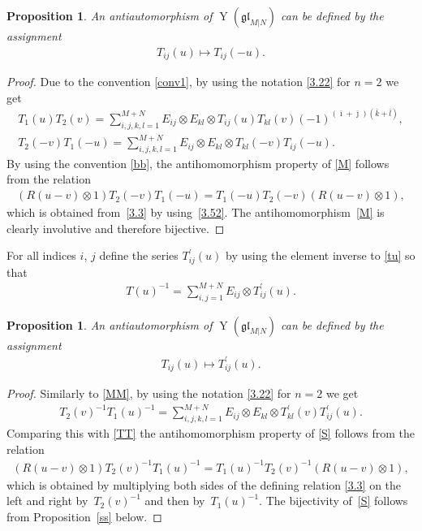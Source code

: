 \documentclass[11pt]{article}
\numberwithin{equation}{section}
\newtheorem{Proposition}[Theorem]{Proposition}
\def\bi{{\bar\imath }}
\def\bj{{\bar\jmath }}
\def\bk{{\bar k }}
\def\bl{{\bar l }}
\def\glMN{\mathfrak{gl}_{M|N}}
\def\ot{\otimes}
\def\TP{T^{\prime}}
\def\YMN{\operatorname{Y}(\glMN)}
\begin{document}
\begin{Proposition}\label{m}
An antiautomorphism of $\YMN$ can be defined by the assignment
\begin{gather}\label{M}
T_{ij}(u)\mapsto T_{ij}(-u) .
\end{gather}
\end{Proposition}

\begin{proof}Due to the convention \eqref{conv1}, by using
the notation \eqref{3.22} for $n=2$ we get
\begin{gather}\label{TT}
T_1(u) T_2(v)=\sum_{i,j,k,l=1}^{M+N}
E_{ij}\ot E_{kl}\ot T_{ij}(u) T_{kl}(v)
{(-1)}^{( \bi+ \bj )( \bk+ \bl )} ,\\
\label{MM}
T_2(-v) T_1(-u)=\sum_{i,j,k,l=1}^{M+N}
E_{ij}\ot E_{kl}\ot T_{kl}(-v) T_{ij}(-u) .
\end{gather}
By using the convention \eqref{bb}, the antihomomorphism property of \eqref{M} follows from the relation
\begin{gather*}
(R (u-v)\ot1) T_2(-v) T_1(-u)=
T_1(-u) T_2(-v) (R (u-v)\ot1),
\end{gather*}
which is obtained from~\eqref{3.3} by using~\eqref{3.52}.
The antihomomorphism~\eqref{M} is clearly involutive and therefore bijective.
\end{proof}

For all indices $i$, $j$ define the series $\TP_{ij}(u)$
by using the element inverse to \eqref{tu} so that
\begin{gather}\label{tunat}
T(u)^{-1}=\sum_{i,j=1}^{M+N} E_{ij}\ot\TP_{ij}(u) .
\end{gather}

\begin{Proposition}\label{s}
An antiautomorphism of $\YMN$ can be defined by the assignment
\begin{gather}\label{S}
T_{ij}(u)\mapsto\TP_{ij}(u) .
\end{gather}
\end{Proposition}

\begin{proof}Similarly to \eqref{MM}, by using
the notation \eqref{3.22} for $n=2$ we get
\begin{gather*}
T_2(v)^{-1} T_1(u)^{-1}=\sum_{i,j,k,l=1}^{M+N}E_{ij}\ot E_{kl}\ot\TP_{kl}(v) \TP_{ij}(u) .
\end{gather*}
Comparing this with \eqref{TT} the antihomomorphism property of \eqref{S} follows from the relation
\begin{gather}\label{3.33}
(R (u-v)\ot1) T_2(v)^{-1} T_1(u)^{-1}=
T_1(u)^{-1} T_2(v)^{-1} (R (u-v)\ot1),
\end{gather}
which is obtained by multiplying both sides of the defining relation \eqref{3.3}
on the left and right by~$T_2(v)^{-1}$ and then by~$T_1(u)^{-1}$.
The bijectivity of~\eqref{S} follows from Proposition~\ref{ss} below.
\end{proof}
\end{document}
